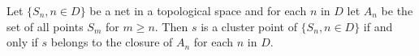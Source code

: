 Let $\{S_n, n \in D\}$ be a net in a topological space and for each $n$ in $D$ let $A_n$ be the set of all points $S_m$ for $m \geq n$. Then $s$ is a cluster point of $\{S_n, n \in D\}$ if and only if $s$ belongs to the closure of $A_n$ for each $n$ in $D$.
